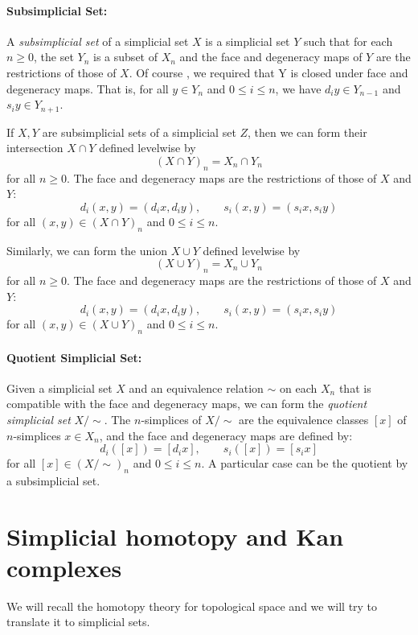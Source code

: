 \documentclass[11pt]{article}
\theoremstyle{definition}
\theoremstyle{plain}
\begin{document}
\paragraph{\textbf{Subsimplicial Set:}}
A \emph{subsimplicial set} of a simplicial set $X$ is a simplicial set $Y$ such that for each $n \geq 0$, the set $Y_n$ is a subset of $X_n$ and the face and degeneracy maps of $Y$ are the restrictions of those of $X$.
Of course , we required that Y is closed under face and degeneracy maps.
That is, for all $y \in Y_n$ and $0 \leq i \leq n$, we have $d_i y \in Y_{n-1}$ and $s_i y \in Y_{n+1}$.

If $X ,Y $ are subsimplicial sets of a simplicial set $Z$, then we can form their intersection $X \cap Y$ defined levelwise by
\[
    (X \cap Y)_n = X_n \cap Y_n
\]
for all $n \geq 0$. The face and degeneracy maps are the restrictions of those of $X$ and $Y$:
\[
    d_i (x,y) = (d_i x, d_i y), \qquad s_i (x,y) = (s_i x, s_i y)
\]
for all $(x,y) \in (X \cap Y)_n$ and $0 \leq i \leq n$.

Similarly, we can form the union $X \cup Y$ defined levelwise by
\[
    (X \cup Y)_n = X_n \cup Y_n
\]
for all $n \geq 0$. The face and degeneracy maps are the restrictions of those of $X$ and $Y$:
\[
    d_i (x,y) = (d_i x, d_i y), \qquad s_i (x,y) = (s_i x, s_i y)
\]
for all $(x,y) \in (X \cup Y)_n$ and $0 \leq i \leq n$.

\paragraph{\textbf{Quotient Simplicial Set:}}
Given a simplicial set $X$ and an equivalence relation $\sim$ on each $X_n$ that is compatible with the face and degeneracy maps, we can form the \emph{quotient simplicial set} $X/\sim$. The $n$-simplices of $X/\sim$ are the equivalence classes $[x]$ of $n$-simplices $x \in X_n$, and the face and degeneracy maps are defined by:
\[
    d_i([x]) = [d_i x], \qquad s_i([x]) = [s_i x]
\]
for all $[x] \in (X/\sim)_n$ and $0 \leq i \leq n$.
A particular case can be the quotient by a subsimplicial set.








\section{Simplicial homotopy and Kan complexes}
We will recall the homotopy theory for topological space and we will try to translate it to simplicial sets.
\end{document}
